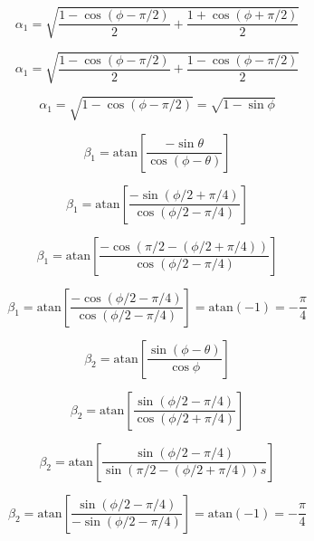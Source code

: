 \documentclass{article}
\begin{document}
\begin{equation}
	\alpha_1 = \sqrt{\frac{1-\cos(\phi-\pi/2)}{2}+\frac{1+\cos(\phi+\pi/2)}{2}}
\end{equation}

\begin{equation}
	\alpha_1 = \sqrt{\frac{1-\cos(\phi-\pi/2)}{2}+\frac{1-\cos(\phi-\pi/2)}{2}}
\end{equation}

\begin{equation}
	\alpha_1 = \sqrt{1-\cos(\phi-\pi/2)} = \sqrt{1-\sin\phi}
\end{equation}

\begin{equation}
	\beta_1 = \text{atan}\left[\frac{-\sin\theta}{\cos(\phi-\theta)}\right]
\end{equation}

\begin{equation}
	\beta_1 = \text{atan}\left[\frac{-\sin(\phi/2+\pi/4)}{\cos(\phi/2-\pi/4)}\right]
\end{equation}

\begin{equation}
	\beta_1 = \text{atan}\left[\frac{-\cos(\pi/2-(\phi/2+\pi/4))}{\cos(\phi/2-\pi/4)}\right]
\end{equation}

\begin{equation}
	\beta_1 = \text{atan}\left[\frac{-\cos(\phi/2-\pi/4)}{\cos(\phi/2-\pi/4)}\right] = \text{atan}(-1) = -\frac{\pi}{4}
\end{equation}

\begin{equation}
	\beta_2 = \text{atan}\left[\frac{\sin(\phi-\theta)}{\cos\phi}\right]
\end{equation}

\begin{equation}
	\beta_2 = \text{atan}\left[\frac{\sin(\phi/2-\pi/4)}{\cos(\phi/2+\pi/4)}\right]
\end{equation}

\begin{equation}
	\beta_2 = \text{atan}\left[\frac{\sin(\phi/2-\pi/4)}{\sin(\pi/2-(\phi/2+\pi/4))s}\right]
\end{equation}

\begin{equation}
	\beta_2 = \text{atan}\left[\frac{\sin(\phi/2-\pi/4)}{-\sin(\phi/2-\pi/4)}\right] = \text{atan}(-1) = -\frac{\pi}{4}
\end{equation}
\end{document}
